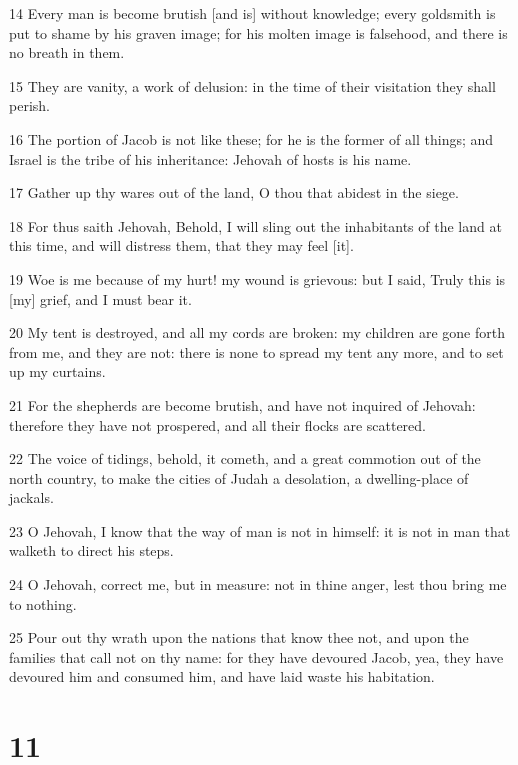 \par 14 Every man is become brutish [and is] without knowledge; every goldsmith is put to shame by his graven image; for his molten image is falsehood, and there is no breath in them.
\par 15 They are vanity, a work of delusion: in the time of their visitation they shall perish.
\par 16 The portion of Jacob is not like these; for he is the former of all things; and Israel is the tribe of his inheritance: Jehovah of hosts is his name.
\par 17 Gather up thy wares out of the land, O thou that abidest in the siege.
\par 18 For thus saith Jehovah, Behold, I will sling out the inhabitants of the land at this time, and will distress them, that they may feel [it].
\par 19 Woe is me because of my hurt! my wound is grievous: but I said, Truly this is [my] grief, and I must bear it.
\par 20 My tent is destroyed, and all my cords are broken: my children are gone forth from me, and they are not: there is none to spread my tent any more, and to set up my curtains.
\par 21 For the shepherds are become brutish, and have not inquired of Jehovah: therefore they have not prospered, and all their flocks are scattered.
\par 22 The voice of tidings, behold, it cometh, and a great commotion out of the north country, to make the cities of Judah a desolation, a dwelling-place of jackals.
\par 23 O Jehovah, I know that the way of man is not in himself: it is not in man that walketh to direct his steps.
\par 24 O Jehovah, correct me, but in measure: not in thine anger, lest thou bring me to nothing.
\par 25 Pour out thy wrath upon the nations that know thee not, and upon the families that call not on thy name: for they have devoured Jacob, yea, they have devoured him and consumed him, and have laid waste his habitation.

\chapter{11}

